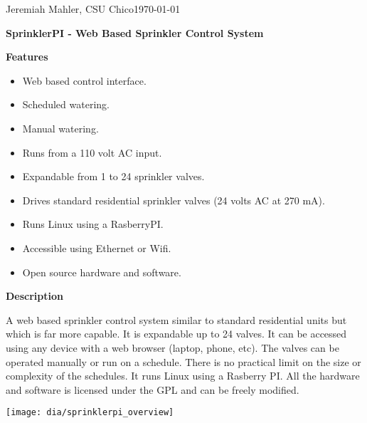 \documentclass{article}
\begin{document}
\noindent Jeremiah Mahler, CSU Chico\hfill \today
\vspace*{0.3in}
\centerline{\Large \textbf{SprinklerPI - Web Based Sprinkler Control System}}
\vspace{0.1in}
\hrulefill

\thispagestyle{empty}

{\large \textbf{Features}}
\begin{itemize}
\item Web based control interface.
\item Scheduled watering.
\item Manual watering.
\item Runs from a 110 volt AC input.
\item Expandable from 1 to 24 sprinkler valves.
\item Drives standard residential sprinkler valves (24 volts AC at 270 mA).
\item Runs Linux using a RasberryPI.
\item Accessible using Ethernet or Wifi.
\item Open source hardware and software.
\end{itemize}

{\large \textbf{Description}}

A web based sprinkler control system similar to standard residential units
but which is far more capable.
It is expandable up to 24 valves.
It can be accessed using any device with a web browser (laptop, phone, etc).
The valves can be operated manually or run on a schedule.
There is no practical limit on the size or complexity of the schedules.
It runs Linux using a Rasberry PI.
All the hardware and software is licensed under the GPL and can
be freely modified.

\vspace{0.14in}

\begin{center}
\hspace{0.5in} \texttt{[image: dia/sprinklerpi\_overview]}
\end{center}

\hrulefill
\end{document}
